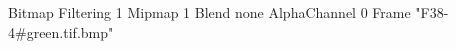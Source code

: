 {Bitmap
	{Filtering 1}
	{Mipmap 1}
	{Blend none}
	{AlphaChannel 0}
	{Frame "F38-4#green.tif.bmp"}
}
